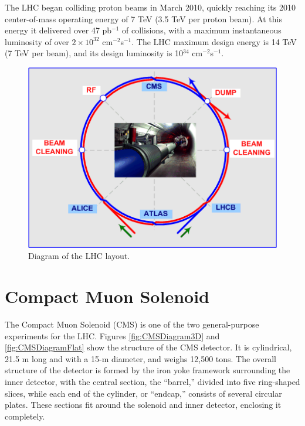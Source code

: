 The LHC began colliding proton beams in March 2010, 
quickly reaching its 2010 center-of-mass operating energy of 7 TeV
(3.5 TeV per proton beam).  
At this energy it delivered over 47 pb$^{-1}$ of collisions, 
with a maximum instantaneous luminosity of over $2\times10^{32}$ cm$^{-2}$s$^{-1}$.  
The LHC maximum design energy is 14 TeV (7 TeV per beam), 
and its design luminosity is 10$^{34}$ cm$^{-2}$s$^{-1}$.  

 \begin{figure}[htb]
  \begin{center}
    \includegraphics[width=360pt]{Figures/lhc-schematic-ml.png} 
  \end{center}
  \caption[\fixspacing Diagram of the LHC layout]
	  {\fixspacing Diagram of the LHC layout.}
  \label{fig:LHCDiagram}
 \end{figure}


\section{Compact Muon Solenoid}
\label{exp:CMS}


The Compact Muon Solenoid (CMS) \cite{CmsExperimentAtCernLHC}
is one of the two general-purpose experiments for the LHC.  
Figures \ref{fig:CMSDiagram3D} and \ref{fig:CMSDiagramFlat} 
show the structure of the CMS detector.  
It is cylindrical, 21.5 m long and with a 15-m diameter, and weighs 12,500 tons.  
The overall structure of the detector is formed by the iron yoke framework surrounding the inner detector,
with the central section, the ``barrel,'' divided into five ring-shaped slices, 
while each end of the cylinder, or ``endcap,'' consists of several circular plates.  
These sections fit around the solenoid and inner detector, enclosing it completely.  

